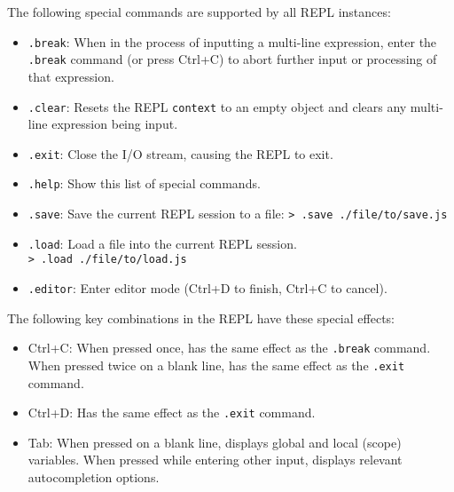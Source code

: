 The following special commands are supported by all REPL instances:

\begin{itemize}
\tightlist
\item
  \texttt{.break}: When in the process of inputting a multi-line
  expression, enter the \texttt{.break} command (or press Ctrl+C) to
  abort further input or processing of that expression.
\item
  \texttt{.clear}: Resets the REPL \texttt{context} to an empty object
  and clears any multi-line expression being input.
\item
  \texttt{.exit}: Close the I/O stream, causing the REPL to exit.
\item
  \texttt{.help}: Show this list of special commands.
\item
  \texttt{.save}: Save the current REPL session to a file:
  \texttt{\textgreater{}\ .save\ ./file/to/save.js}
\item
  \texttt{.load}: Load a file into the current REPL session.
  \texttt{\textgreater{}\ .load\ ./file/to/load.js}
\item
  \texttt{.editor}: Enter editor mode (Ctrl+D to finish, Ctrl+C to
  cancel).
\end{itemize}

\begin{Shaded}
\begin{Highlighting}[]
\NormalTok{\}}


\NormalTok{\textgreater{}}
\end{Highlighting}
\end{Shaded}

The following key combinations in the REPL have these special effects:

\begin{itemize}
\tightlist
\item
  Ctrl+C: When pressed once, has the same effect as the \texttt{.break}
  command. When pressed twice on a blank line, has the same effect as
  the \texttt{.exit} command.
\item
  Ctrl+D: Has the same effect as the \texttt{.exit} command.
\item
  Tab: When pressed on a blank line, displays global and local (scope)
  variables. When pressed while entering other input, displays relevant
  autocompletion options.
\end{itemize}

